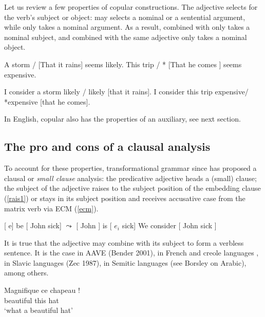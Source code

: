 \documentclass[output=paper]{langsci/langscibook}
\begin{document}
Let us review a few properties of copular constructions.
The adjective selects for the verb's subject or object:  may selects a nominal or a sentential argument, while  only takes a nominal argument. As a result,  combined with  only takes a nominal subject, and  combined with the same adjective only takes a nominal object.


\begin{exe}
\ex \label{storm}
\begin{xlist}
\ex A storm / [That it rains] seems likely.
\ex This trip / * [That he comes ] seems expensive.
\end{xlist}
\ex \begin{xlist}
\ex 	I consider a storm likely / likely [that it rains].
\ex 	I consider this trip expensive/ *expensive [that he comes].
\end{xlist}	
\end{exe}

In English, copular  also has the properties of an auxiliary, see next section.

\subsection{The pro and cons of a clausal analysis}
To account for these properties, transformational grammar since \citet{Chomsky1986, Stowell1983} has proposed a clausal or \emph{small clause} analysis: the predicative adjective heads a (small) clause; the subject of the adjective raises to the subject position of the embedding clause (\ref{rais1}) or stays in its subject position and receives accusative case from the matrix verb via ECM (\ref{ecm}).


\begin{exe}
\ex  {}[ e] be [ John sick] $\leadsto$  [ John ] is  [ $e_{i}$ sick] \label{rais1}
\ex   We consider [ John sick ] \label{ecm}
\end{exe}

It is true that the adjective may combine with its subject to form a verbless sentence. It is the case in AAVE (Bender 2001), in French \citet{Laurens2008} and creole languages \citet{HenriandAbeille2007}, in Slavic languages (Zec 1987), in Semitic languages (see Borsley on Arabic), among others. 

\begin{exe}
\ex \gll Magnifique ce chapeau !\\
beautiful this hat\\
\glt `what a beautiful hat'
\end{exe}
\end{document}
